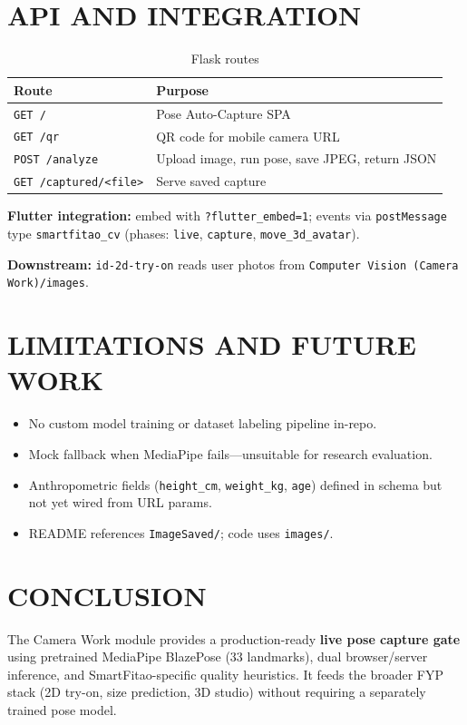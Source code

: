 \documentclass[a4paper,fleqn]{cas-sc}
\newcommand{\tblheadrow}{\rowcolor{tblhead}}
\begin{document}
\section{API AND INTEGRATION}

\begin{table}[h]
\centering
\caption{Flask routes}
\label{tab:routes}
\begin{tabular}{@{}ll@{}}
\tblheadrow
\textbf{Route} & \textbf{Purpose} \\
\midrule
\texttt{GET /} & Pose Auto-Capture SPA \\
\texttt{GET /qr} & QR code for mobile camera URL \\
\texttt{POST /analyze} & Upload image, run pose, save JPEG, return JSON \\
\texttt{GET /captured/<file>} & Serve saved capture \\
\end{tabular}
\end{table}

\textbf{Flutter integration:} embed with \texttt{?flutter\_embed=1}; events via \texttt{postMessage} type \texttt{smartfitao\_cv} (phases: \texttt{live}, \texttt{capture}, \texttt{move\_3d\_avatar}).

\textbf{Downstream:} \texttt{id-2d-try-on} reads user photos from \texttt{Computer Vision (Camera Work)/images}.

\section{LIMITATIONS AND FUTURE WORK}

\begin{itemize}
  \item No custom model training or dataset labeling pipeline in-repo.
  \item Mock fallback when MediaPipe fails---unsuitable for research evaluation.
  \item Anthropometric fields (\texttt{height\_cm}, \texttt{weight\_kg}, \texttt{age}) defined in schema but not yet wired from URL params.
  \item README references \texttt{ImageSaved/}; code uses \texttt{images/}.
\end{itemize}

\section{CONCLUSION}

The Camera Work module provides a production-ready \textbf{live pose capture gate} using pretrained MediaPipe BlazePose (33 landmarks), dual browser/server inference, and SmartFitao-specific quality heuristics. It feeds the broader FYP stack (2D try-on, size prediction, 3D studio) without requiring a separately trained pose model.
\end{document}
